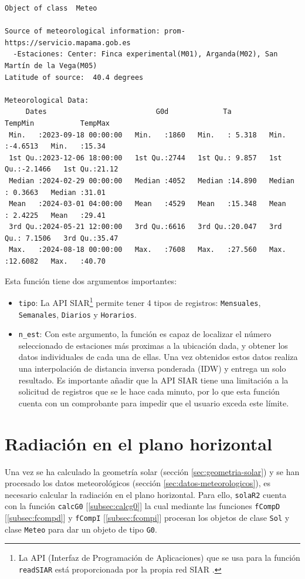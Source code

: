\begin{verbatim}
Object of class  Meteo 

Source of meteorological information: prom-https://servicio.mapama.gob.es 
  -Estaciones: Center: Finca experimental(M01), Arganda(M02), San Martín de la Vega(M05) 
Latitude of source:  40.4 degrees

Meteorological Data:
     Dates                          G0d             Ta            TempMin           TempMax     
 Min.   :2023-09-18 00:00:00   Min.   :1860   Min.   : 5.318   Min.   :-4.6513   Min.   :15.34  
 1st Qu.:2023-12-06 18:00:00   1st Qu.:2744   1st Qu.: 9.857   1st Qu.:-2.1466   1st Qu.:21.12  
 Median :2024-02-29 00:00:00   Median :4052   Median :14.890   Median : 0.3663   Median :31.01  
 Mean   :2024-03-01 04:00:00   Mean   :4529   Mean   :15.348   Mean   : 2.4225   Mean   :29.41  
 3rd Qu.:2024-05-21 12:00:00   3rd Qu.:6616   3rd Qu.:20.047   3rd Qu.: 7.1506   3rd Qu.:35.47  
 Max.   :2024-08-18 00:00:00   Max.   :7608   Max.   :27.560   Max.   :12.6082   Max.   :40.70
\end{verbatim}

Esta función tiene dos argumentos importantes:
\begin{itemize}
\item \texttt{tipo}: La API SIAR\footnote{La API (Interfaz de Programación de Aplicaciones) que se usa para la función \texttt{readSIAR} está proporcionada por la propia red SIAR \cite{siar23}.} permite tener 4 tipos de registros: \texttt{Mensuales}, \texttt{Semanales}, \texttt{Diarios} y \texttt{Horarios}.
\item \texttt{n\_est}: Con este argumento, la función es capaz de localizar el número seleccionado de estaciones más proximas a la ubicación dada, y obtener los datos individuales de cada una de ellas. Una vez obtenidos estos datos realiza una interpolación de distancia inversa ponderada (IDW) y entrega un solo resultado. Es importante añadir que la API SIAR tiene una limitación a la solicitud de registros que se le hace cada minuto, por lo que esta función cuenta con un comprobante para impedir que el usuario exceda este límite.
\end{itemize}

\section{Radiación en el plano horizontal}
\label{sec:org93dd9d6}
\label{sec:radiacion-plano-horizontal}
Una vez se ha calculado la geometría solar (sección \ref{sec:geometria-solar}) y se han procesado los datos meteorológicos (sección \ref{sec:datos-meteorologicos}), es necesario calcular la radiación en el plano horizontal. Para ello, \texttt{solaR2} cuenta con la función \texttt{calcG0} [\ref{subsec:calcg0}] la cual mediante las funciones \texttt{fCompD} [\ref{subsec:fcompd}] y \texttt{fCompI} [\ref{subsec:fcompi}] procesan los objetos de clase \texttt{Sol} y clase \texttt{Meteo} para dar un objeto de tipo \texttt{G0}.


